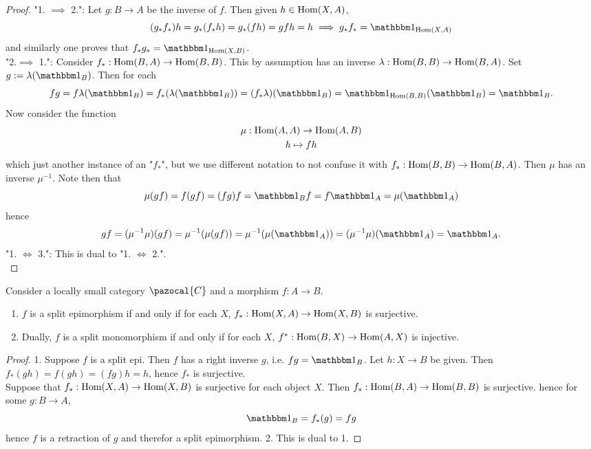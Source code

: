 \begin{proof}
    "1. $\implies$ 2.": Let $g : B\rightarrow A$ be the inverse of $f$. Then given $h\in \mathrm{Hom}(X,A)$,
    $$(g_\ast f_\ast)h = g_\ast(f_\ast h)= g_\ast(fh)=gfh=h \implies g_\ast f_\ast = \fone_{\Hom(X,A)}$$
    and similarly one proves that $f_\ast g_\ast = \fone_{\Hom(X,B)}$.\\
    "2.$\implies$ 1.": Consider $f_\ast : \mathrm{Hom}(B,A)\rightarrow \mathrm{Hom}(B,B)$. This by assumption has an inverse $\lambda : \mathrm{Hom}(B,B)\rightarrow \mathrm{Hom}(B,A)$. Set $g := \lambda(\fone_B)$. Then for each  
    $$fg = f \lambda(\fone_B)= f_\ast(\lambda(\fone_B))=(f_\ast\lambda)(\fone_B)=\fone_{\Hom(B,B)}(\fone_B)=\fone_B.$$
    Now consider the function 
    \begin{gather*}
        \mu : \mathrm{Hom}(A,A)\rightarrow \mathrm{Hom}(A,B)\\
        h\mapsto fh
    \end{gather*}
    which just another instance of an "$f_\ast$", but we use different notation to not confuse it with $f_\ast: \mathrm{Hom}(B,B)\rightarrow \mathrm{Hom}(B,A)$. Then $\mu$ has an inverse $\mu^{-1}$. Note then that
    $$
        \mu(gf)= f(gf)=(fg)f= \fone_B f = f\fone_A= \mu(\fone_A)
    $$
    hence 
    $$
        gf = (\mu^{-1}\mu)(gf) = \mu^{-1}(\mu(gf)) = \mu^{-1}(\mu(\fone_A))= (\mu^{-1}\mu)(\fone_A) = \fone_A.
    $$
    "1. $\iff$ 3.": This is dual to "1. $\iff$ 2.".\\
\end{proof}
\begin{lemma}
    Consider a locally small category $\pazocal{C}$ and a morphism $f:A\rightarrow B$.
    \begin{enumerate}
        \item $f$ is a split epimorphism if and only if for each $X$, $f_\ast: \mathrm{Hom}(X,A) \rightarrow \mathrm{Hom}(X,B)$ is surjective. 
        \item Dually, $f$ is a split monomorphism if and only if for each $X$, $f^\ast : \mathrm{Hom}(B,X)\rightarrow \mathrm{Hom}(A,X)$ is injective. 
    \end{enumerate}
\end{lemma}
\begin{proof}
    1. Suppose $f$ is a split epi. Then $f$ has a right inverse $g$, i.e. $fg = \fone_B$. Let $h: X \rightarrow B$ be given. Then $f_\ast(gh)= f(gh)=(fg)h = h$, hence $f_\ast$ is surjective.\\ 
    Suppose that $f_\ast: \mathrm{Hom}(X,A)\rightarrow \mathrm{Hom}(X,B)$ is surjective for each object $X$. Then $f_\ast: \mathrm{Hom}(B,A) \rightarrow \mathrm{Hom}(B,B)$ is surjective. hence for some $g:B\rightarrow A$, 
    $$
        \fone_B=f_\ast(g) = fg
    $$ 
    hence $f$ is a retraction of $g$ and therefor a split epimorphism. 
    2. This is dual to 1. 
\end{proof}

